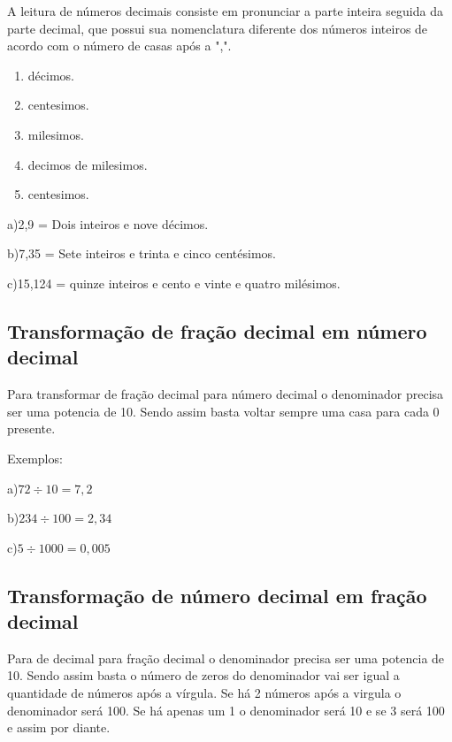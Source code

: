 \documentclass[letterpaper]{book}
\begin{document}
A leitura de números decimais consiste em pronunciar a parte inteira seguida da parte decimal, que possui sua nomenclatura diferente dos números inteiros de acordo com o número de casas após a ",".

\begin{enumerate}
\item décimos.
\item centesimos.
\item milesimos.
\item decimos de milesimos.
\item centesimos.
\end{enumerate}


a)2,9 = Dois inteiros e nove décimos.

\vspace{0.5em}

b)7,35 = Sete inteiros e trinta e cinco centésimos.

\vspace{0.5em}

c)15,124 = quinze inteiros e cento e vinte e quatro milésimos.

\vspace{0.5em}

\subsection{Transformação de fração decimal em número decimal}

Para transformar de fração decimal para número decimal o denominador precisa ser uma potencia de 10. Sendo assim basta voltar sempre uma casa para cada 0 presente.

Exemplos:

\vspace{0.5em}

a)\(72 \div 10 = 7,2\)

\vspace{0.5em}

b)\(234 \div 100 = 2,34\)

\vspace{0.5em}

c)\(5 \div 1000 = 0,005\)

\subsection{Transformação de número decimal em fração decimal}

Para de decimal para fração decimal o denominador precisa ser uma potencia de 10. Sendo assim basta o número de zeros do denominador vai ser igual a quantidade de números após a vírgula. Se há 2 números após a virgula o denominador será 100. Se há apenas um 1 o denominador será 10 e se 3 será 100 e assim por diante.
  
\end{document}
